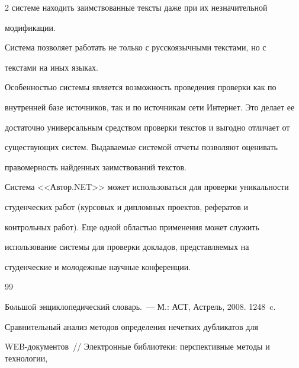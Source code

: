 \begin{multicols}{2}
  сис\-те\-ме находить заимствованные тексты даже при их незначительной 

модификации. 

  

  Система позволяет работать не только с русскоязычными текстами, но с 

текстами на иных языках. 

  

  Особенностью системы является возможность проведения проверки как по 

внутренней базе источников, так и по источникам сети Интернет. Это делает ее 

достаточно универсальным средством проверки текстов и выгодно отличает от 

существующих сис\-тем. Выдаваемые сис\-те\-мой отчеты позволяют оценивать 

правомерность найденных заимствований текстов. 

  

  Система <<Автор.NET>> может использоваться для проверки уникальности 

студенческих работ (курсовых и дипломных проектов, рефератов и 

контрольных работ). Еще одной областью применения может служить 

использование сис\-те\-мы для проверки докладов, представляемых на 

студенческие и молодежные научные конференции.



{\small\frenchspacing

{%


\begin{thebibliography}{99}




  Большой энциклопедический словарь.~--- М.: АСТ, Астрель, 2008. 1248~c.

  



  Сравнительный анализ методов определения нечетких дубликатов для\linebreak 

  WEB-до\-ку\-мен\-тов~// Электронные библиотеки: перспективные методы и технологии, 


\end{thebibliography}}}
\end{multicols}
